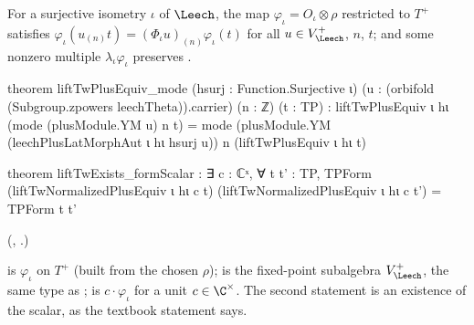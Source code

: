 \begin{theorem}\label{ch22:thm:twcov}
For a surjective isometry $\iota$ of $\Leech$, the map $\varphi_\iota=O_\iota\otimes\rho$ restricted to $T^+$ satisfies
$\varphi_\iota(u_{(n)}t)=(\Phi_\iota u)_{(n)}\varphi_\iota(t)$ for all $u\in V_\Leech^+$, $n$, $t$; and some nonzero
multiple $\lambda_\iota\varphi_\iota$ preserves .
\end{theorem}
\begin{leancode}
theorem liftTwPlusEquiv_mode (hsurj : Function.Surjective ι)
    (u : (orbifold (Subgroup.zpowers leechTheta)).carrier) (n : ℤ) (t : TP) :
    liftTwPlusEquiv ι hι (mode (plusModule.YM u) n t) =
      mode (plusModule.YM (leechPlusLatMorphAut ι hι hsurj u)) n (liftTwPlusEquiv ι hι t)
\end{leancode}
\begin{leancode}
theorem liftTwExists_formScalar : ∃ c : ℂˣ, ∀ t t' : TP,
    TPForm (liftTwNormalizedPlusEquiv ι hι c t)
      (liftTwNormalizedPlusEquiv ι hι c t') = TPForm t t'
\end{leancode}
(, .)
\begin{dictionary}
 is $\varphi_\iota$ on $T^+$ (built from the chosen $\rho$);
 is the fixed-point subalgebra $V_\Leech^+$, the same type as
;  is $c\cdot\varphi_\iota$ for a unit $c\in\C^\times$.  The second
statement is an existence of the scalar, as the textbook statement says.
\end{dictionary}
